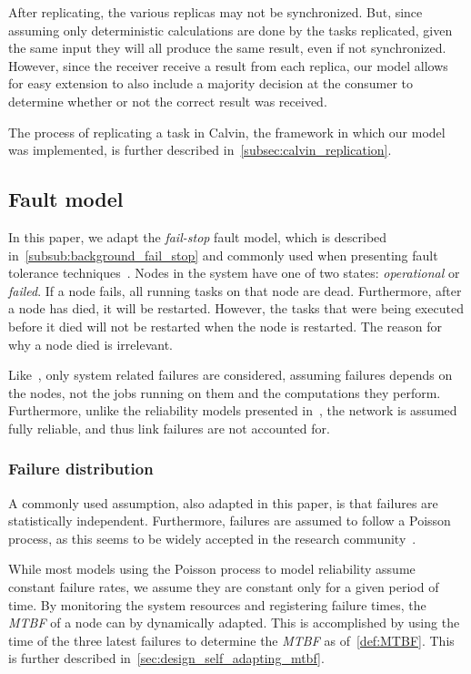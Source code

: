 \documentclass{cslthse-msc}
\begin{document}
After replicating, the various replicas may not be synchronized. But, since assuming only deterministic calculations are done by the tasks replicated, given the same input they will all produce the same result, even if not synchronized. However, since the receiver receive a result from each replica, our model allows for easy extension to also include a majority decision at the consumer to determine whether or not the correct result was received. %

The process of replicating a task in Calvin, the framework in which our model was implemented, is further described in~\cref{subsec:calvin_replication}.

\subsection{Fault model} \label{subsec:design_fault_model}
In this paper, we adapt the \emph{fail-stop} fault model, which is described in~\cref{subsub:background_fail_stop} and commonly used when presenting fault tolerance techniques~\cite{surveyFaultParallel}. Nodes in the system have one of two states: \emph{operational} or \emph{failed}. If a node fails, all running tasks on that node are dead. Furthermore, after a node has died, it will be restarted. However, the tasks that were being executed before it died will not be restarted when the node is restarted. The reason for why a node died is irrelevant.

Like~\cite{selfAdaptRel}, only system related failures are considered, assuming failures depends on the nodes, not the jobs running on them and the computations they perform. Furthermore, unlike the reliability models presented in~\cite{taskSchedulingReplication, taskAllocationSwarm, relAnalysisFRA}, the network is assumed fully reliable, and thus link failures are not accounted for.

\subsubsection{Failure distribution} \label{design:failure_distribution}
A commonly used assumption, also adapted in this paper, is that failures are statistically independent. Furthermore, failures are assumed to follow a Poisson process, as this seems to be widely accepted in the research community~\cite{experimentalFailureAssessment}. 

While most models using the Poisson process to model reliability assume constant failure rates, we assume they are constant only for a given period of time. By monitoring the system resources and registering failure times, the \emph{MTBF} of a node can by dynamically adapted. This is accomplished by using the time of the three latest failures to determine the \emph{MTBF} as of~\cref{def:MTBF}. This is further described in~\cref{sec:design_self_adapting_mtbf}. 
\end{document}
